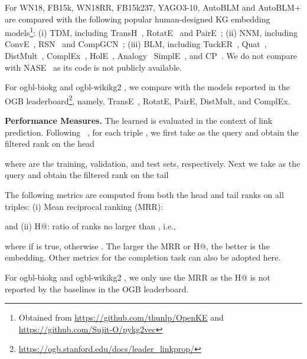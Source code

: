 \documentclass[10pt,journal,compsoc]{IEEEtran}
\newcommand{\parabegin}[1]{\vspace{3px}\noindent\textbf{#1}}
\begin{document}
For WN18, FB15k, WN18RR, FB15k237, YAGO3-10,
AutoBLM and AutoBLM+
are compared
with the following popular
 human-designed 
KG embedding models\footnote{Obtained from
\url{https://github.com/thunlp/OpenKE} and \url{https://github.com/Sujit-O/pykg2vec}}:
(i) TDM, including
TransH~\cite{wang2014knowledge}, RotatE~\cite{sun2019rotate}
and PairE~\cite{chao2021pairre};
(ii)
NNM, including
ConvE~\cite{dettmers2017convolutional},
 RSN~\cite{guo2019learning}
 and CompGCN~\cite{vashishth2019composition};
(iii)
BLM, including
TuckER~\cite{balavzevic2019tucker},
Quat~\cite{zhang2019quaternion},
DistMult~\cite{yang2014embedding},
ComplEx~\cite{trouillon2017knowledge},
HolE~\cite{nickel2016holographic},
Analogy~\cite{liu2017analogical}
SimplE~\cite{kazemi2018simple},
and
CP~\cite{lacroix2018canonical}.
We do not
compare
with NASE~\cite{kou2020nase} as
its code is not publicly available.

For ogbl-biokg and ogbl-wikikg2 \cite{hu2020open}, we 
compare with
the models reported in the
OGB leaderboard\footnote{\url{https://ogb.stanford.edu/docs/leader_linkprop/}},
namely,
TransE~\cite{bordes2013translating},
		RotatE,
		PairE,
		DistMult, and
		ComplEx.




\parabegin{Performance Measures.}
The learned  
is evaluated in the context
of link prediction.  
Following 
~\cite{yang2014embedding,trouillon2017knowledge,liu2017analogical,kazemi2018simple,dettmers2017convolutional,wang2017knowledge},
for each triple ,
we first take  as the query and obtain the filtered rank on the head 

where
 are the training,
validation, and
test 
sets, respectively.
Next
we take   
as the query 
and obtain the filtered rank on the tail 

The following metrics
are computed from both the head and tail ranks on all triples:
(i) Mean reciprocal ranking (MRR):

and
(ii) 
H@: 
ratio of ranks no larger than , i.e., 

where  if  is true, otherwise . 
The larger the MRR or H@, the better is the embedding.
Other metrics 
for the completion task 
\cite{wang2019evaluating,tabacof2019probability}
can also be adopted here.

For ogbl-biokg and ogbl-wikikg2 \cite{hu2020open},
we only use the MRR as
the H@ is not reported by the baselines in the OGB leaderboard. 
\end{document}
